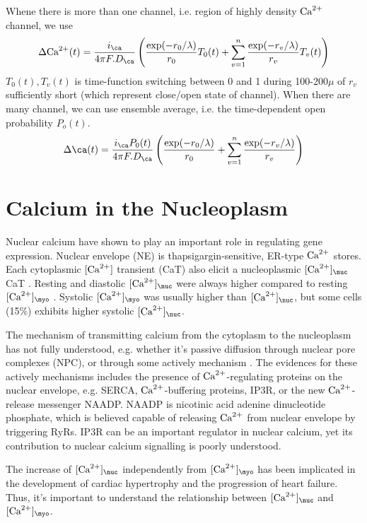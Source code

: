 Whene there is more than one channel, i.e. region of highly density ${\text{Ca}^{2+}}$
channel, we use
\begin{equation}
\Delta \Ca(t) = \frac{i_\ca}{4\pi F. D_\ca} \left(
\frac{\exp(-r_0/\lambda)}{r_0} T_0(t) + \sum_{v=1}^{n}
\frac{\exp(-r_v/\lambda)}{r_v} T_v(t) \right)
\end{equation}
$T_0(t), T_v(t)$ is time-function switching between 0 and 1 during 100-200$\mu$
of $r_v$ sufficiently short (which represent close/open state of channel). When
there are many channel, we can use ensemble average, i.e. the time-dependent
open probability $P_o(t)$.
\begin{equation}
\Delta \ca(t) = \frac{i_\ca P_0(t)}{4\pi F. D_\ca} \left(
\frac{\exp(-r_0/\lambda)}{r_0}  + \sum_{v=1}^{n}
\frac{\exp(-r_v/\lambda)}{r_v} \right)
\end{equation}





\section{Calcium in the Nucleoplasm}

Nuclear calcium have shown to play an important role in regulating gene
expression. Nuclear envelope (NE) is thapsigargin-sensitive, ER-type ${\text{Ca}^{2+}}$
stores. Each cytoplasmic $[{\text{Ca}^{2+}}]$ transient (CaT) also elicit a nucleoplasmic
$[\Ca]_\nuc$ CaT \citep{genka1999, Kockskamper2008}. Resting and diastolic
$[\Ca]_\nuc$ were always higher compared to resting $[\Ca]_\myo$
\citep{tucker1990}.
Systolic $[\Ca]_\myo$ was usually higher than $[\Ca]_\nuc$, but some cells
(15\%) exhibits higher systolic $[\Ca]_\nuc$.

The mechanism of transmitting calcium from the cytoplasm to the nucleoplasm has
not fully understood, e.g. whether it's passive diffusion through nuclear pore
complexes (NPC), or through some actively mechanism \citep{gerasimenko2004}. The
evidences for these actively mechanisms includes the presence of
${\text{Ca}^{2+}}$-regulating proteins on the nuclear envelope, e.g. SERCA, ${\text{Ca}^{2+}}$-buffering
proteins, IP3R, or the new ${\text{Ca}^{2+}}$-release messenger NAADP. NAADP is nicotinic
acid adenine dinucleotide phosphate, which is believed capable of releasing
${\text{Ca}^{2+}}$ from nuclear envelope by triggering RyRs. IP3R can be an important
regulator in nuclear calcium, yet its contribution to nuclear calcium signalling is poorly
understood.


The increase of $[\Ca]_\nuc$ independently from $[\Ca]_\myo$ has been implicated
in the development of cardiac hypertrophy \citep{little2009} and the progression
of heart failure. Thus, it's important to understand the relationship between
$[\Ca]_\nuc$ and $[\Ca]_\myo$.

